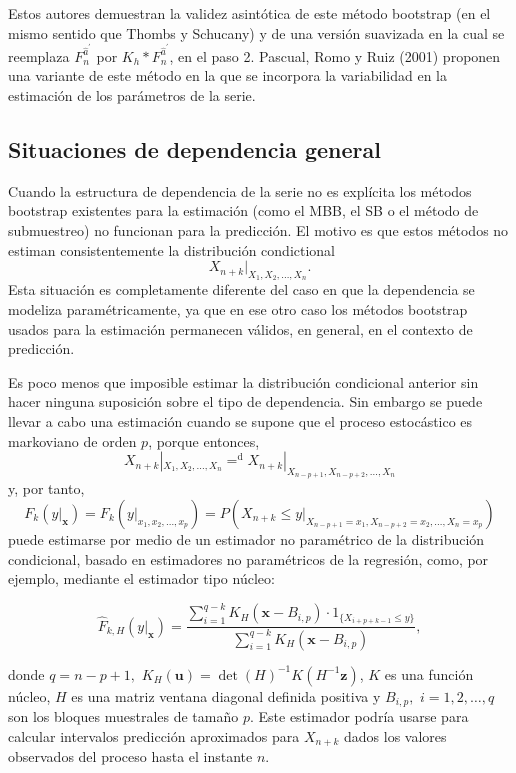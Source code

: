 \documentclass[
]{book}
\theoremstyle{break}
\theoremstyle{definition}
\theoremstyle{definition}
\theoremstyle{definition}
\theoremstyle{definition}
\theoremstyle{remark}
\begin{document}
Estos autores demuestran la validez asintótica de este método bootstrap
(en el mismo sentido que Thombs y Schucany) y de una versión suavizada
en la cual se reemplaza \(F_n^{\widehat{a}^{\prime}}\) por
\(K_{h}\ast F_n^{\widehat{a}^{\prime}}\), en el paso 2. Pascual, Romo y
Ruiz (2001) proponen una variante de este método en la que se incorpora
la variabilidad en la estimación de los parámetros de la serie.

\hypertarget{situaciones-de-dependencia-general-2}{%
\subsection{Situaciones de dependencia general}\label{situaciones-de-dependencia-general-2}}

Cuando la estructura de dependencia de la serie no es explícita los
métodos bootstrap existentes para la estimación (como el MBB, el SB o el
método de submuestreo) no funcionan para la predicción. El motivo es que
estos métodos no estiman consistentemente la distribución condictional
\[X_{n+k}|_{X_1,X_2,\ldots ,X_n}.\]
Esta situación es
completamente diferente del caso en que la dependencia se modeliza
paramétricamente, ya que en ese otro caso los métodos bootstrap usados
para la estimación permanecen válidos, en general, en el contexto de
predicción.

Es poco menos que imposible estimar la distribución condicional anterior
sin hacer ninguna suposición sobre el tipo de dependencia. Sin embargo
se puede llevar a cabo una estimación cuando se supone que el proceso
estocástico es markoviano de orden \(p\), porque entonces,
\[X_{n+k}|_{X_1,X_2,\ldots ,X_n}{=}^{\mathrm{d}
}X_{n+k}|_{X_{n-p+1},X_{n-p+2},\ldots ,X_n}\]
y, por tanto,
\[F_{k}(y|_{\mathbf{x}})=F_{k}(y|_{x_1,x_2,\ldots ,x_{p}})=P\left(
X_{n+k}\leq y|_{X_{n-p+1}=x_1,X_{n-p+2}=x_2,\ldots ,X_n=x_{p}} \right)\]
puede estimarse por medio de un estimador no paramétrico de la distribución
condicional, basado en estimadores no paramétricos de la regresión,
como, por ejemplo, mediante el estimador tipo núcleo:

\[\widehat{F}_{k,H}(y|_{\mathbf{x}})=\frac{\sum_{i=1}^{q-k}K_{H}(\mathbf{x}
-B_{i,p})\cdot 1_{\{X_{i+p+k-1}\leq y\}}}{\sum_{i=1}^{q-k}K_{H}(\mathbf{x}
-B_{i,p})},\]

donde \(q=n-p+1,\) \(K_{H}(\mathbf{u})=\det (H)^{-1}K(H^{-1}\mathbf{z})\), \(K\) es
una función núcleo, \(H\) es una matriz ventana diagonal definida positiva
y \(B_{i,p},\) \(i=1,2,\ldots ,q\) son los bloques muestrales de tamaño \(p\).
Este estimador podría usarse para calcular intervalos predicción
aproximados para \(X_{n+k}\) dados los valores observados del proceso
hasta el instante \(n\).
\end{document}
